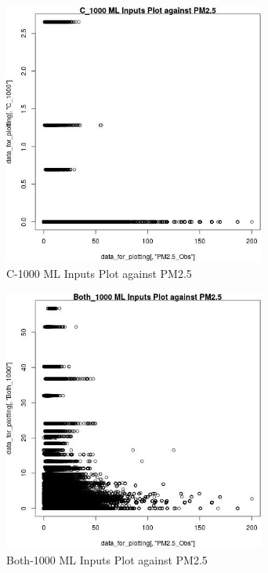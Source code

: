 \begin{figure} 
\centering  
\includegraphics[width=0.77\textwidth]{Code_Outputs/ML_input_report_ML_input_PM25_Step5_part_d_de_duplicated_aves_ML_input_C_1000vPM25_Obs.jpg} 
\caption{\label{fig:ML_input_report_ML_input_PM25_Step5_part_d_de_duplicated_aves_ML_inputC_1000vPM25_Obs}C-1000 ML Inputs Plot against PM2.5} 
\end{figure} 
 

\begin{figure} 
\centering  
\includegraphics[width=0.77\textwidth]{Code_Outputs/ML_input_report_ML_input_PM25_Step5_part_d_de_duplicated_aves_ML_input_Both_1000vPM25_Obs.jpg} 
\caption{\label{fig:ML_input_report_ML_input_PM25_Step5_part_d_de_duplicated_aves_ML_inputBoth_1000vPM25_Obs}Both-1000 ML Inputs Plot against PM2.5} 
\end{figure} 
 

